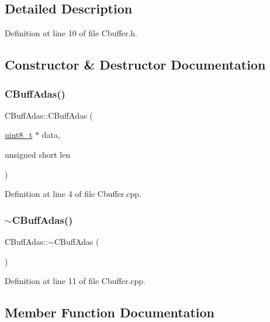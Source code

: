 \subsection{Detailed Description}


Definition at line 10 of file Cbuffer.\+h.



\subsection{Constructor \& Destructor Documentation}
\mbox{\label{class_c_buff_adas_afb14758fc413199161d48963a83edadb}} 
\subsubsection{\texorpdfstring{C\+Buff\+Adas()}{CBuffAdas()}}
{\footnotesize\ttfamily C\+Buff\+Adas\+::\+C\+Buff\+Adas (\begin{DoxyParamCaption}\item[{\mbox{\hyperlink{_a_d_a_s___types_8h_aba7bc1797add20fe3efdf37ced1182c5}{uint8\+\_\+t}} $\ast$}]{data,  }\item[{unsigned short}]{len }\end{DoxyParamCaption})}



Definition at line 4 of file Cbuffer.\+cpp.

\mbox{\label{class_c_buff_adas_a55af513577ba8522492fff4db85da247}} 
\subsubsection{\texorpdfstring{$\sim$\+C\+Buff\+Adas()}{~CBuffAdas()}}
{\footnotesize\ttfamily C\+Buff\+Adas\+::$\sim$\+C\+Buff\+Adas (\begin{DoxyParamCaption}{ }\end{DoxyParamCaption})}



Definition at line 11 of file Cbuffer.\+cpp.



\subsection{Member Function Documentation}
\mbox{\label{class_c_buff_adas_ad131824caddc2ee1b90a629e4c30f215}} 
